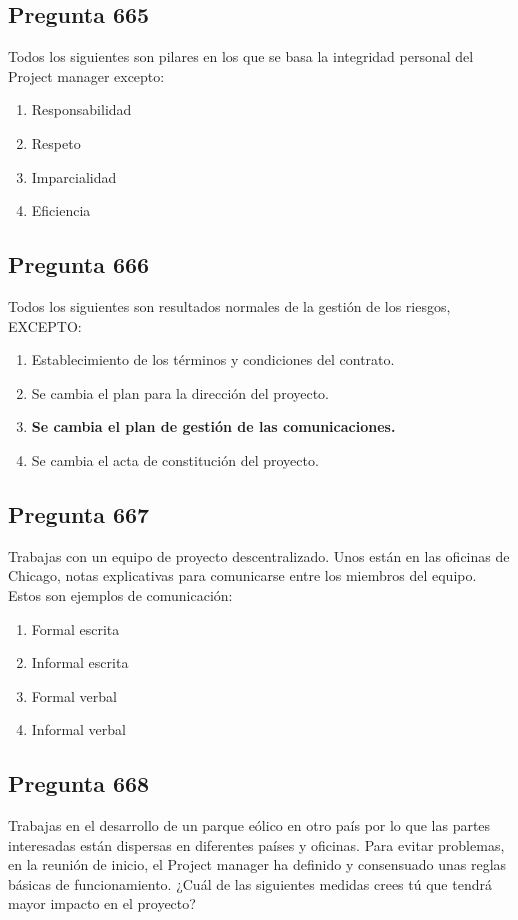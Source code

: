 \documentclass[11pt,a4paper]{article}
\begin{document}
\subsection*{Pregunta 665}
Todos los siguientes son pilares en los que se basa la integridad personal del Project manager excepto:

\begin{enumerate}[label=\alph*)]
  \item Responsabilidad
  \item Respeto
  \item Imparcialidad
  \item Eficiencia
\end{enumerate}

\subsection*{Pregunta 666}
Todos los siguientes son resultados normales de la gestión de los riesgos, EXCEPTO:

\begin{enumerate}[label=\alph*)]
  \item Establecimiento de los términos y condiciones del contrato.
  \item Se cambia el plan para la dirección del proyecto.
  \item \textbf{Se cambia el plan de gestión de las comunicaciones.}
  \item Se cambia el acta de constitución del proyecto.
\end{enumerate}

\subsection*{Pregunta 667}
Trabajas con un equipo de proyecto descentralizado. Unos están en las oficinas de Chicago, notas explicativas para comunicarse entre los miembros del equipo. Estos son ejemplos de comunicación:

\begin{enumerate}[label=\alph*)]
  \item Formal escrita
  \item Informal escrita
  \item Formal verbal
  \item Informal verbal
\end{enumerate}

\subsection*{Pregunta 668}
Trabajas en el desarrollo de un parque eólico en otro país por lo que las partes interesadas están dispersas en diferentes países y oficinas. Para evitar problemas, en la reunión de inicio, el Project manager ha definido y consensuado unas reglas básicas de funcionamiento. ¿Cuál de las siguientes medidas crees tú que tendrá mayor impacto en el proyecto?
\end{document}
